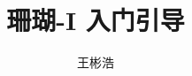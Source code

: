 \documentclass{thesis-uestc}
\title{珊瑚-I 入门引导}{aCoral-I Guide Manual}
\author{王彬浩}{Wang BinHao}
\begin{document}
\makecover





\thesistableofcontents





\end{document}
